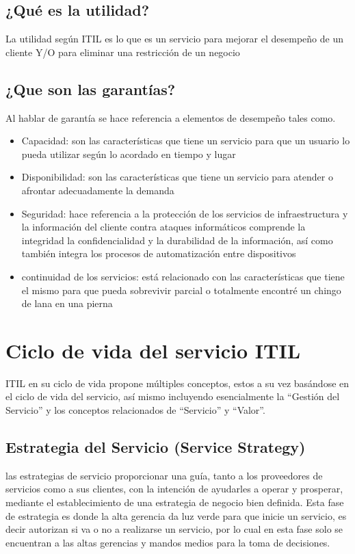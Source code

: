  \subsection{¿Qué es la utilidad?}
 La utilidad según ITIL es lo que es un servicio para mejorar el desempeño de un cliente Y/O para eliminar una restricción de un negocio
  \subsection{¿Que son las garantías?}
 Al hablar de garantía se hace referencia a elementos de desempeño tales como.
 \begin{itemize}
 	\item  Capacidad: son las características que tiene un servicio para que un usuario lo pueda utilizar según lo acordado en tiempo y lugar
 	\item Disponibilidad: son las características que tiene un servicio para atender o afrontar adecuadamente la demanda
	\item Seguridad: hace referencia a la protección de los servicios de infraestructura y la información del cliente contra ataques informáticos comprende la integridad la confidencialidad y la durabilidad de la información, así como también integra los procesos de automatización entre dispositivos
	\item continuidad de los servicios: está relacionado con las características que tiene el mismo para que pueda sobrevivir parcial o totalmente encontré un chingo de lana en una pierna
 \end{itemize}


\section{Ciclo de vida del servicio ITIL}
 
 ITIL en su ciclo de vida propone múltiples conceptos, estos a su vez  basándose en el  ciclo de vida del servicio, así mismo incluyendo esencialmente la “Gestión del Servicio” y los conceptos relacionados de “Servicio” y “Valor”. 
 \subsection{Estrategia del Servicio (Service Strategy)}
 las estrategias de servicio proporcionar una guía, tanto a los proveedores de servicios como a sus clientes, con la intención de ayudarles a operar y prosperar, mediante el establecimiento de una estrategia de negocio bien definida.
 Esta fase de estrategia es donde la alta gerencia da luz verde para que inicie un servicio, es decir autorizan si va o no a realizarse un servicio,  por lo cual  en esta fase solo se encuentran a las altas gerencias y mandos medios para la toma de decisiones. 
 

